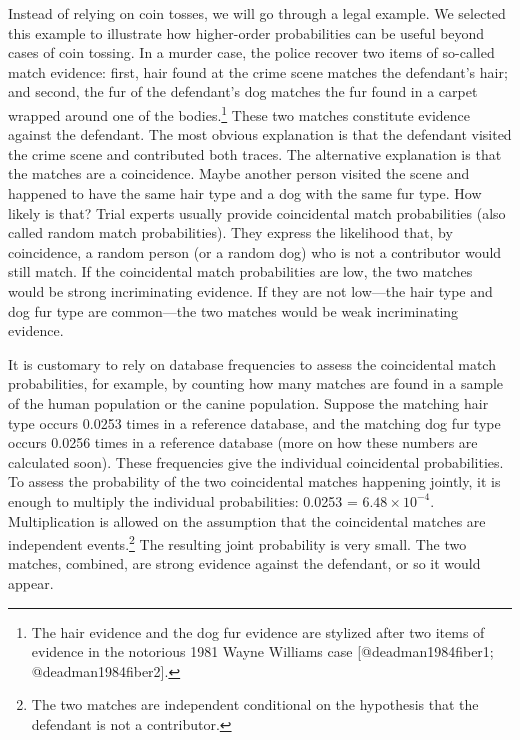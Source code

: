 \documentclass[
  letterpaper,
  DIV=11,
  numbers=noendperiod]{scrartcl}
\begin{document}
Instead of relying on coin tosses, we will go through a legal example.
We selected this example to illustrate how higher-order probabilities
can be useful beyond cases of coin tossing. In a murder case, the police
recover two items of so-called match evidence: first, hair found at the
crime scene matches the defendant's hair; and second, the fur of the
defendant's dog matches the fur found in a carpet wrapped around one of
the bodies.\footnote{The hair evidence and the dog fur evidence are
  stylized after two items of evidence in the notorious 1981 Wayne
  Williams case {[}@deadman1984fiber1; @deadman1984fiber2{]}.} These two
matches constitute evidence against the defendant. The most obvious
explanation is that the defendant visited the crime scene and
contributed both traces. The alternative explanation is that the matches
are a coincidence. Maybe another person visited the scene and happened
to have the same hair type and a dog with the same fur type. How likely
is that? Trial experts usually provide coincidental match probabilities
(also called random match probabilities). They express the likelihood
that, by coincidence, a random person (or a random dog) who is not a
contributor would still match. If the coincidental match probabilities
are low, the two matches would be strong incriminating evidence. If they
are not low---the hair type and dog fur type are common---the two
matches would be weak incriminating evidence.

It is customary to rely on database frequencies to assess the
coincidental match probabilities, for example, by counting how many
matches are found in a sample of the human population or the canine
population. Suppose the matching hair type occurs 0.0253 times in a
reference database, and the matching dog fur type occurs 0.0256 times in
a reference database (more on how these numbers are calculated soon).
These frequencies give the individual coincidental probabilities. To
assess the probability of the two coincidental matches happening
jointly, it is enough to multiply the individual probabilities: 0.0253
 = \ensuremath{6.48\times 10^{-4}}. Multiplication is
allowed on the assumption that the coincidental matches are independent
events.\footnote{The two matches are independent conditional on the
  hypothesis that the defendant is not a contributor.} The resulting
joint probability is very small. The two matches, combined, are strong
evidence against the defendant, or so it would appear.
\end{document}
